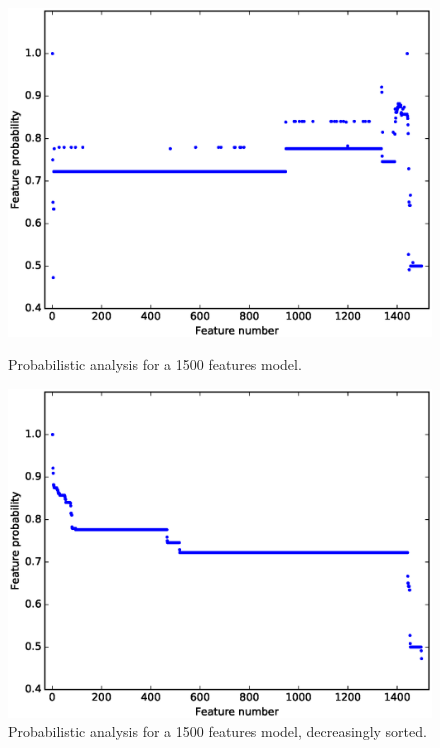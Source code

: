 \begin{figure}[h]
	\centering
	\begin{minipage}[b]{0.48\textwidth}
		\includegraphics[width=\textwidth]{plot_probs_probs.eps}
\caption{Probabilistic analysis for a 1500 features model.}\label{fig:plot:probs:probs}
	\end{minipage}
	\hfill
	\begin{minipage}[b]{0.48\textwidth}
		\includegraphics[width=\textwidth]{plot_probs_probs_sorted.eps}
	\caption{Probabilistic analysis for a 1500 features model, decreasingly sorted.}\label{fig:plot:probs:probs:sorted}
	\end{minipage}
\end{figure}


